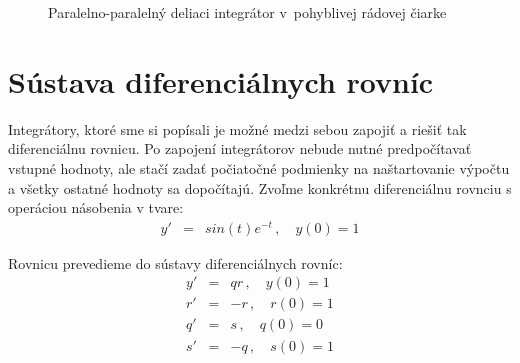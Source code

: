 \begin{figure}[h]
\centering
{}
\caption{Paralelno-paralelný deliaci integrátor v~pohyblivej rádovej čiarke}
\label{ppdi_fp}
\end{figure}
\bigskip

\newpage
\section{Sústava diferenciálnych rovníc} \label{navrhSustava}
Integrátory, ktoré sme si popísali je možné medzi sebou zapojiť a riešiť tak diferenciálnu rovnicu. Po zapojení integrátorov nebude nutné predpočítavať vstupné hodnoty, ale stačí zadať počiatočné podmienky na naštartovanie výpočtu a všetky ostatné hodnoty sa dopočítajú.
Zvoľme konkrétnu diferenciálnu rovnciu s operáciou násobenia v tvare:
\begin{eqnarray}
y' & = & sin(t) e^{-t} \, , \quad y(0) = 1 \label{dif_sint_et}
\end{eqnarray}
\bigskip

Rovnicu prevedieme do sústavy diferenciálnych rovníc:
\begin{eqnarray}
y' & = & qr \, , \quad y(0) = 1 \nonumber \\
r' & = & -r \, , \quad r(0) = 1 \nonumber \\
q' & = & s \, , \quad q(0) = 0 \nonumber \\
s' & = & -q \, , \quad s(0) = 1 \nonumber \\
\end{eqnarray}

